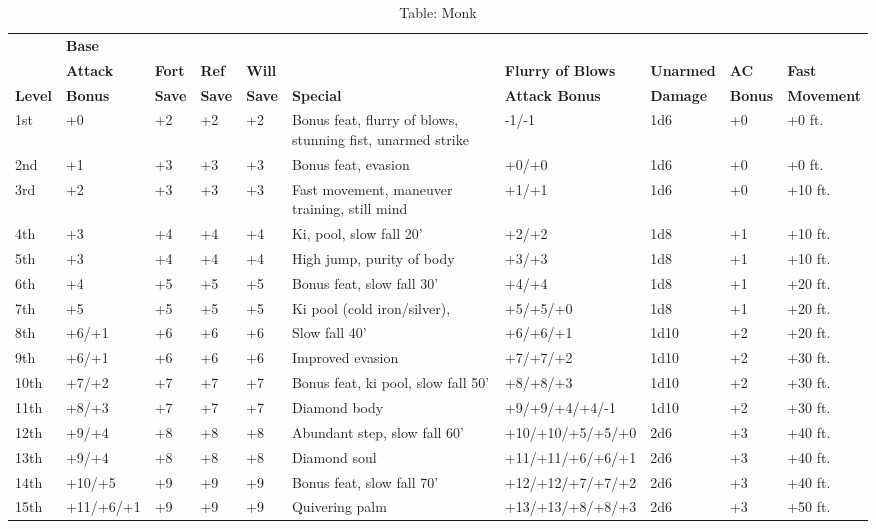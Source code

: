 \begin{table*}[]
\sffamily
\setlength{\tabcolsep}{1pt}
\caption{Table: Monk}
\begin{tabularx}{\linewidth}{lllllXllll}
      & \textbf{Base}   &      &      &      &         &                 &         &       & \\
      & \textbf{Attack} & \textbf{Fort} & \textbf{Ref}  & \textbf{Will} &         & \textbf{Flurry of Blows} & \textbf{Unarmed} & \textbf{AC}    & \textbf{Fast}\\
\textbf{Level} & \textbf{Bonus}  & \textbf{Save} & \textbf{Save} & \textbf{Save} & \textbf{Special} &  \textbf{Attack Bonus}   &  \textbf{Damage} & \textbf{Bonus} & \textbf{Movement}\\
1st & +0 & +2 & +2 & +2 & Bonus feat, flurry of blows, stunning fist, unarmed strike & -1/-1 & 1d6 & +0 & +0 ft.\\
2nd & +1 & +3 & +3 & +3 & Bonus feat, evasion & +0/+0 & 1d6 & +0 & +0 ft.\\
3rd & +2 & +3 & +3 & +3 & Fast movement, maneuver training, still mind & +1/+1 & 1d6 & +0 & +10 ft.\\
4th & +3 & +4 & +4 & +4 & Ki,  pool, slow fall 20' & +2/+2 & 1d8 & +1 & +10 ft.\\
5th & +3 & +4 & +4 & +4 & High jump, purity of body & +3/+3 & 1d8 & +1 & +10 ft.\\
6th & +4 & +5 & +5 & +5 & Bonus feat, slow fall 30' & +4/+4 & 1d8 & +1 & +20 ft.\\
7th & +5 & +5 & +5 & +5 & Ki pool (cold iron/silver),  & +5/+5/+0 & 1d8 & +1 & +20 ft.\\
8th & +6/+1 & +6 & +6 & +6 & Slow fall 40' & +6/+6/+1 & 1d10 & +2 & +20 ft.\\
9th & +6/+1 & +6 & +6 & +6 & Improved evasion & +7/+7/+2 & 1d10 & +2 & +30 ft.\\
10th & +7/+2 & +7 & +7 & +7 & Bonus feat, ki pool, slow fall 50' & +8/+8/+3 & 1d10 & +2 & +30 ft.\\
11th & +8/+3 & +7 & +7 & +7 & Diamond body & +9/+9/+4/+4/-1 & 1d10 & +2 & +30 ft.\\
12th & +9/+4 & +8 & +8 & +8 & Abundant step, slow fall 60' & +10/+10/+5/+5/+0 & 2d6 & +3 & +40 ft.\\
13th & +9/+4 & +8 & +8 & +8 & Diamond soul & +11/+11/+6/+6/+1 & 2d6 & +3 & +40 ft.\\
14th & +10/+5 & +9 & +9 & +9 & Bonus feat, slow fall 70' & +12/+12/+7/+7/+2 & 2d6 & +3 & +40 ft.\\
15th & +11/+6/+1 & +9 & +9 & +9 & Quivering palm & +13/+13/+8/+8/+3 & 2d6 & +3 & +50 ft.\\

\end{tabularx}
\end{table*}

